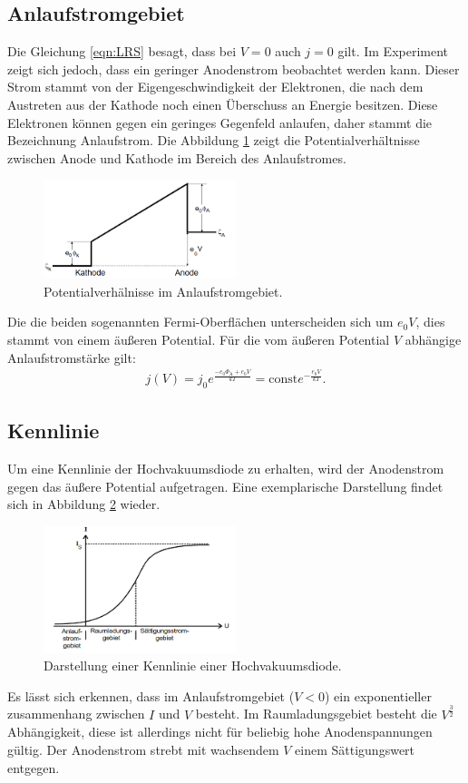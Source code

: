 \subsection{Anlaufstromgebiet}
Die Gleichung \eqref{eqn:LRS} besagt, dass bei $V=0$ auch $j=0$ gilt. Im Experiment zeigt sich jedoch,
dass ein geringer Anodenstrom beobachtet werden kann. Dieser Strom stammt von der Eigengeschwindigkeit
der Elektronen, die nach dem Austreten aus der Kathode noch einen Überschuss an Energie besitzen.
Diese Elektronen können gegen ein geringes Gegenfeld anlaufen, daher stammt die Bezeichnung Anlaufstrom.
Die Abbildung \ref{fig:pv} zeigt die Potentialverhältnisse zwischen Anode und Kathode im Bereich des Anlaufstromes.
\begin{figure}
 \centering
 \includegraphics[width=0.5\textwidth]{pv.png}
 \caption{Potentialverhälnisse im Anlaufstromgebiet.\cite{sample}}
 \label{fig:pv}
 \end{figure}
Die die beiden sogenannten Fermi-Oberflächen unterscheiden sich um $e_\mathrm{0}V$, dies stammt von einem
äußeren Potential. Für die vom äußeren Potential $V$  abhängige Anlaufstromstärke gilt:
\begin{align}
j(V)=j_\mathrm{0}e^{\frac{-e_\mathrm{0}\Phi_\mathrm{A}+e_\mathrm{0}V}{kT}}=\mathrm{const}e^{-\frac{e_\mathrm{0}V}{kT}}\label{eqn:pot}.
\end{align}

\subsection{Kennlinie}
Um eine Kennlinie der Hochvakuumsdiode zu erhalten, wird der Anodenstrom gegen das äußere Potential
aufgetragen. Eine exemplarische Darstellung findet sich in Abbildung \ref{fig:kennlinie} wieder.
\begin{figure}
 \centering
 \includegraphics[width=0.5\textwidth]{kennlinie.png}
 \caption{Darstellung einer Kennlinie einer Hochvakuumsdiode.\cite{sample}}
 \label{fig:kennlinie}
 \end{figure}
Es lässt sich erkennen, dass im Anlaufstromgebiet ($V<0$) ein exponentieller zusammenhang
zwischen $I$ und $V$ besteht. Im Raumladungsgebiet besteht die $V^{\frac{3}{2}}$ Abhängigkeit, diese ist
allerdings nicht für beliebig hohe Anodenspannungen gültig. Der Anodenstrom strebt mit wachsendem $V$
einem Sättigungswert entgegen.
